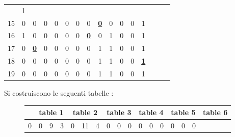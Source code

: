 \begin{esempio}
\begin{table}[H]
\begin{tabular}{c|ccccccccccccccc}
                                                                & 1 \\
       15 & 0 & 0 & 0 & 0 & 0 & 0 & 0 & {\color{nordred}\textbf{\underline{0}}} & 0 & 0 & 0
                                                                & 1 \\
       16 & 1 & 0 & 0 & 0 & 0 & 0 & {\color{nordred}\textbf{\underline{0}}} & 0 & 1 & 0 & 0
                                                                & 1 \\
       17 & 0 & {\color{nordred}\textbf{\underline{0}}} & 0 & 0 & 0 & 0 & 0 & 1 & 1 & 0 & 0
                                                                & 1 \\
       18 & 0 & 0 & 0 & 0 & 0 & 0 & 0 & 1 & 1 & 0 & 0
                                                                & {\color{nordred}\textbf{\underline{1}}} \\ 
       19 & 0 & 0 & 0 & 0 & 0 & 0 & 0 & 1 & 1 & 0 & 0 & 1 \\
     \end{tabular}
   \end{table}
   \noindent
   Si costruiscono le seguenti tabelle \cite{tricks}:
   \begin{figure}[H]
     \centering
     \footnotesize
     {\begin{tabular}{r|rrr|rrr|rrr|rrr|rrr|rrr}
        \multicolumn{1}{c}{} &
                               \multicolumn{3}{c}{table 1} &
                                                             \multicolumn{3}{c}{table 2} &
                                                                                           \multicolumn{3}{c}{table 3} &
                                                                                                                         \multicolumn{3}{c}{table 4} &
                                                                                                                                                       \multicolumn{3}{c}{table 5} &
                                                                                                                                                                                     \multicolumn{3}{c}{table 6} \\
        \hline
        0 &  0 &  9 &  3 &  0 & 11 &  4 &  0 &  0 &  0 &  \textcolor{nordred}{0} &  \textcolor{nordred}{0} &  \textcolor{nordred}{0}
                                        &  \textcolor{nordred}{0} &  \textcolor{nordred}{0} &  \textcolor{nordred}{0}

\end{tabular}}
\end{figure}
\end{esempio}
